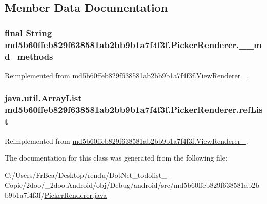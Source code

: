 \subsection{Member Data Documentation}
\hypertarget{classmd5b60ffeb829f638581ab2bb9b1a7f4f3f_1_1_picker_renderer_8a968a337192314e31ec4d605077182c}{
\subsubsection[{\_\-\_\-md\_\-methods}]{\setlength{\rightskip}{0pt plus 5cm}final String {\bf md5b60ffeb829f638581ab2bb9b1a7f4f3f.PickerRenderer.\_\-\_\-md\_\-methods}}}
\label{classmd5b60ffeb829f638581ab2bb9b1a7f4f3f_1_1_picker_renderer_8a968a337192314e31ec4d605077182c}




Reimplemented from \hyperlink{classmd5b60ffeb829f638581ab2bb9b1a7f4f3f_1_1_view_renderer__2_80b609e3e4054c380887d4dc2907a875}{md5b60ffeb829f638581ab2bb9b1a7f4f3f.ViewRenderer\_}.\hypertarget{classmd5b60ffeb829f638581ab2bb9b1a7f4f3f_1_1_picker_renderer_7de5daff58c215b987daa2f1c47cdee5}{
\subsubsection[{refList}]{\setlength{\rightskip}{0pt plus 5cm}java.util.ArrayList {\bf md5b60ffeb829f638581ab2bb9b1a7f4f3f.PickerRenderer.refList}}}
\label{classmd5b60ffeb829f638581ab2bb9b1a7f4f3f_1_1_picker_renderer_7de5daff58c215b987daa2f1c47cdee5}




Reimplemented from \hyperlink{classmd5b60ffeb829f638581ab2bb9b1a7f4f3f_1_1_view_renderer__2_6c151401977148a92c515e9c7de1aaf8}{md5b60ffeb829f638581ab2bb9b1a7f4f3f.ViewRenderer\_}.

The documentation for this class was generated from the following file:\begin{CompactItemize}
\item 
C:/Users/FrBea/Desktop/rendu/DotNet\_\-todolist\_ - Copie/2doo/\_\-2doo.Android/obj/Debug/android/src/md5b60ffeb829f638581ab2bb9b1a7f4f3f/\hyperlink{md5b60ffeb829f638581ab2bb9b1a7f4f3f_2_picker_renderer_8java}{PickerRenderer.java}\end{CompactItemize}
